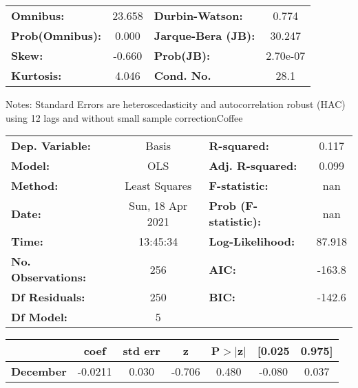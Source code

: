 \begin{center}
\begin{tabular}{lcccccc}
\bottomrule
\end{tabular}
\begin{tabular}{lclc}
\textbf{Omnibus:}       & 23.658 & \textbf{  Durbin-Watson:     } &    0.774  \\
\textbf{Prob(Omnibus):} &  0.000 & \textbf{  Jarque-Bera (JB):  } &   30.247  \\
\textbf{Skew:}          & -0.660 & \textbf{  Prob(JB):          } & 2.70e-07  \\
\textbf{Kurtosis:}      &  4.046 & \textbf{  Cond. No.          } &     28.1  \\
\bottomrule
\end{tabular}
\end{center}

Notes: \newline
 [1] Standard Errors are heteroscedasticity and autocorrelation robust (HAC) using 12 lags and without small sample correctionCoffee\begin{center}
\begin{tabular}{lclc}
\toprule
\textbf{Dep. Variable:}    &      Basis       & \textbf{  R-squared:         } &     0.117   \\
\textbf{Model:}            &       OLS        & \textbf{  Adj. R-squared:    } &     0.099   \\
\textbf{Method:}           &  Least Squares   & \textbf{  F-statistic:       } &       nan   \\
\textbf{Date:}             & Sun, 18 Apr 2021 & \textbf{  Prob (F-statistic):} &      nan    \\
\textbf{Time:}             &     13:45:34     & \textbf{  Log-Likelihood:    } &    87.918   \\
\textbf{No. Observations:} &         256      & \textbf{  AIC:               } &    -163.8   \\
\textbf{Df Residuals:}     &         250      & \textbf{  BIC:               } &    -142.6   \\
\textbf{Df Model:}         &           5      & \textbf{                     } &             \\
\bottomrule
\end{tabular}
\begin{tabular}{lcccccc}
                  & \textbf{coef} & \textbf{std err} & \textbf{z} & \textbf{P$> |$z$|$} & \textbf{[0.025} & \textbf{0.975]}  \\
\midrule
\textbf{December} &      -0.0211  &        0.030     &    -0.706  &         0.480        &       -0.080    &        0.037     \\

\end{tabular}
\end{center}
